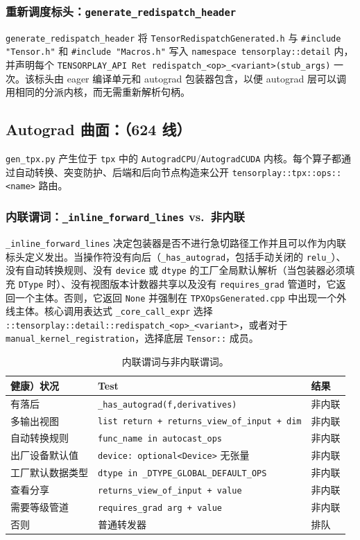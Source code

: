 \subsubsection{重新调度标头：\texttt{generate\_redispatch\_header}}

\texttt{generate\_redispatch\_header} 将 \texttt{TensorRedispatchGenerated.h} 与 \texttt{\#include "Tensor.h"} 和 \texttt{\#include "Macros.h"} 写入 \texttt{namespace tensorplay::detail} 内，并声明每个 \texttt{TENSORPLAY\_API Ret redispatch\_<op>\_<variant>(stub\_args)} 一次。该标头由 eager 编译单元和 autograd 包装器包含，以便 autograd 层可以调用相同的分派内核，而无需重新解析句柄。

\subsection{Autograd 曲面：（624 线）}

\texttt{gen\_tpx.py} 产生位于 \texttt{tpx} 中的 \texttt{AutogradCPU}/\texttt{AutogradCUDA} 内核。每个算子都通过自动转换、突变防护、后端和后向节点构造来公开 \texttt{tensorplay::tpx::ops::<name>} 路由。

\subsubsection{内联谓词：\texttt{\_inline\_forward\_lines} vs.\ 非内联}

\texttt{\_inline\_forward\_lines} 决定包装器是否不进行急切路径工作并且可以作为内联标头定义发出。当操作符没有向后（\texttt{\_has\_autograd}，包括手动关闭的 \texttt{relu\_}）、没有自动转换规则、没有 \texttt{device} 或 \texttt{dtype} 的工厂全局默认解析（当包装器必须填充 \texttt{DType} 时）、没有视图版本计数器共享以及没有 \texttt{requires\_grad} 管道时，它返回一个主体。否则，它返回 \texttt{None} 并强制在 \texttt{TPXOpsGenerated.cpp} 中出现一个外线主体。核心调用表达式 \texttt{\_core\_call\_expr} 选择 \texttt{::tensorplay::detail::redispatch\_<op>\_<variant>}，或者对于 \texttt{manual\_kernel\_registration}，选择底层 \texttt{Tensor::} 成员。

\begin{table}[H]
\centering
\caption{内联谓词与非内联谓词。}
\label{tab:tpxinline}
\small
\begin{tabular}{lll}
\toprule
健康）状况 & Test & 结果 \\
\midrule
有落后 & \texttt{\_has\_autograd(f,derivatives)} & 非内联 \\
多输出视图 & \texttt{list return + returns\_view\_of\_input + dim} & 非内联 \\
自动转换规则 & \texttt{func\_name in autocast\_ops} & 非内联 \\
出厂设备默认值 & \texttt{device: optional<Device>} 无张量 & 非内联 \\
工厂默认数据类型 & \texttt{dtype in \_DTYPE\_GLOBAL\_DEFAULT\_OPS} & 非内联 \\
查看分享 & \texttt{returns\_view\_of\_input + value} & 非内联 \\
需要等级管道 & \texttt{requires\_grad arg + value} & 非内联 \\
否则 & 普通转发器 & 排队 \\
\bottomrule
\end{tabular}
\end{table}

